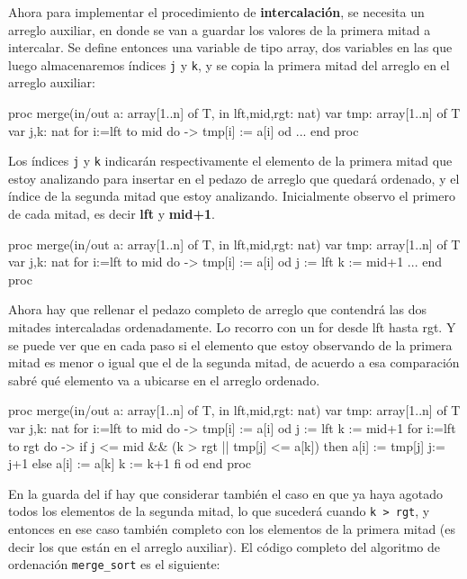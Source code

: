 Ahora para implementar el procedimiento de \textbf{intercalación}, se necesita un arreglo auxiliar, en donde se van a guardar los valores de la primera mitad a intercalar.
Se define entonces una variable de tipo array, dos variables en las que luego almacenaremos índices \texttt{j} y \texttt{k}, y se copia la primera mitad del arreglo en el arreglo auxiliar:
\begin{pascallike}
proc merge(in/out a: array[1..n] of T, in lft,mid,rgt: nat)
    var tmp: array[1..n] of T
    var j,k: nat
    for i:=lft to mid do ->
        tmp[i] := a[i] 
    od
    ...
end proc
\end{pascallike}
Los índices \texttt{j} y \texttt{k} indicarán respectivamente el elemento de la primera mitad que estoy analizando para insertar en el pedazo de arreglo que quedará ordenado, y el índice de la segunda mitad que estoy analizando. Inicialmente observo el primero de cada mitad, es decir \textbf{lft} y \textbf{mid+1}.
\begin{pascallike}
proc merge(in/out a: array[1..n] of T, in lft,mid,rgt: nat)
    var tmp: array[1..n] of T
    var j,k: nat
    for i:=lft to mid do ->
        tmp[i] := a[i] 
    od
    j := lft
    k := mid+1
    ...
end proc
\end{pascallike}
Ahora hay que rellenar el pedazo completo de arreglo que contendrá las dos mitades intercaladas ordenadamente. Lo recorro con un for desde lft hasta rgt. Y se puede ver que en cada paso si el elemento que estoy observando de la primera mitad es menor o igual que el de la segunda mitad, de acuerdo a esa comparación sabré qué elemento va a ubicarse en el arreglo ordenado.
\begin{pascallike}
proc merge(in/out a: array[1..n] of T, in lft,mid,rgt: nat)
    var tmp: array[1..n] of T
    var j,k: nat
    for i:=lft to mid do ->
        tmp[i] := a[i] 
    od
    j := lft
    k := mid+1
    for i:=lft to rgt do ->
        if j <= mid && (k > rgt || tmp[j] <= a[k])
            then a[i] := tmp[j]
                j:= j+1
            else a[i] := a[k]
                k := k+1
        fi
    od
end proc
\end{pascallike}
En la guarda del if hay que considerar también el caso en que ya haya agotado todos los elementos de la segunda mitad, lo que sucederá cuando \texttt{k > rgt}, y entonces en ese caso también completo con los elementos de la primera mitad (es decir los que están en el arreglo auxiliar).
\newpage
El código completo del algoritmo de ordenación \texttt{merge\_sort} es el siguiente:
